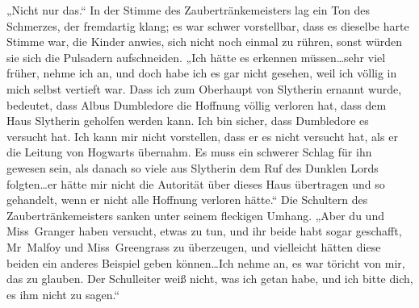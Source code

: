 „Nicht nur das.“
In der Stimme des Zaubertränkemeisters lag ein Ton des Schmerzes, der fremdartig klang; es war schwer vorstellbar, dass es dieselbe harte Stimme war, die Kinder anwies, sich nicht noch einmal zu rühren, sonst würden sie sich die Pulsadern aufschneiden.
„Ich hätte es erkennen müssen…sehr viel früher, nehme ich an, und doch habe ich es gar nicht gesehen, weil ich völlig in mich selbst vertieft war. Dass ich zum Oberhaupt von Slytherin ernannt wurde, bedeutet, dass Albus Dumbledore die Hoffnung völlig verloren hat, dass dem Haus Slytherin geholfen werden kann. Ich bin sicher, dass Dumbledore es versucht hat. Ich kann mir nicht vorstellen, dass er es nicht versucht hat, als er die Leitung von Hogwarts übernahm. Es muss ein schwerer Schlag für ihn gewesen sein, als danach so viele aus Slytherin dem Ruf des Dunklen Lords folgten…er hätte mir nicht die Autorität über dieses Haus übertragen und so gehandelt, wenn er nicht alle Hoffnung verloren hätte.“
Die Schultern des Zaubertränkemeisters sanken unter seinem fleckigen Umhang. „Aber du und Miss~Granger haben versucht, etwas zu tun, und ihr beide habt sogar geschafft, Mr~Malfoy und Miss~Greengrass zu überzeugen, und vielleicht hätten diese beiden ein anderes Beispiel geben können…Ich nehme an, es war töricht von mir, das zu glauben. Der Schulleiter weiß nicht, was ich getan habe, und ich bitte dich, es ihm nicht zu sagen.“


